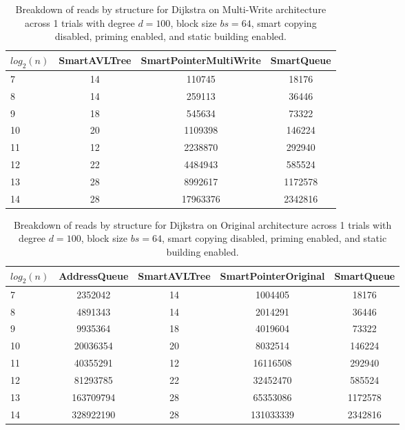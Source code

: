 \begin{table}[]
\centering
\begin{tabular}{|l|c|c|c|}
$log_2(n)$ & SmartAVLTree & SmartPointerMultiWrite & SmartQueue \\ \hline
7 & 14 & 110745 & 18176 \\ \hline
8 & 14 & 259113 & 36446 \\ \hline
9 & 18 & 545634 & 73322 \\ \hline
10 & 20 & 1109398 & 146224 \\ \hline
11 & 12 & 2238870 & 292940 \\ \hline
12 & 22 & 4484943 & 585524 \\ \hline
13 & 28 & 8992617 & 1172578 \\ \hline
14 & 28 & 17963376 & 2342816 \\ \hline
\end{tabular}
\caption{Breakdown of reads by structure for Dijkstra on Multi-Write architecture across 1 trials with degree $d=100$, block size $bs=64$, smart copying disabled, priming enabled, and static building enabled.}
    \label{tab:reads_by_structure_dijkstra_d100_bs64_trials1_copiesfalse_primetrue_staticinsertiontrue_ptmultiwrite_movetrue}
\end{table}

\begin{table}[]
\centering
\begin{tabular}{|l|c|c|c|c|}
$log_2(n)$ & AddressQueue & SmartAVLTree & SmartPointerOriginal & SmartQueue \\ \hline
7 & 2352042 & 14 & 1004405 & 18176 \\ \hline
8 & 4891343 & 14 & 2014291 & 36446 \\ \hline
9 & 9935364 & 18 & 4019604 & 73322 \\ \hline
10 & 20036354 & 20 & 8032514 & 146224 \\ \hline
11 & 40355291 & 12 & 16116508 & 292940 \\ \hline
12 & 81293785 & 22 & 32452470 & 585524 \\ \hline
13 & 163709794 & 28 & 65353086 & 1172578 \\ \hline
14 & 328922190 & 28 & 131033339 & 2342816 \\ \hline
\end{tabular}
\caption{Breakdown of reads by structure for Dijkstra on Original architecture across 1 trials with degree $d=100$, block size $bs=64$, smart copying disabled, priming enabled, and static building enabled.}
    \label{tab:reads_by_structure_dijkstra_d100_bs64_trials1_copiesfalse_primetrue_staticinsertiontrue_ptoriginal_movefalse}
\end{table}

